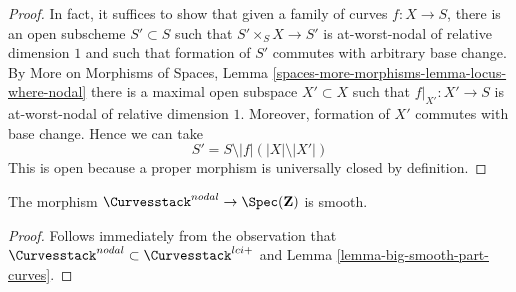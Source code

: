 \begin{proof}
In fact, it suffices to show that given a family of curves
$f : X \to S$, there is an open subscheme $S' \subset S$
such that $S' \times_S X \to S'$ is at-worst-nodal of relative dimension $1$
and such that formation of $S'$ commutes with arbitrary base change.
By More on Morphisms of Spaces, Lemma
\ref{spaces-more-morphisms-lemma-locus-where-nodal}
there is a maximal open subspace $X' \subset X$ such
that $f|_{X'} : X' \to S$ is at-worst-nodal of relative dimension $1$.
Moreover, formation of $X'$ commutes with base change.
Hence we can take
$$
S' = S \setminus |f|(|X| \setminus |X'|)
$$
This is open because a proper morphism is universally closed by
definition.
\end{proof}

\begin{lemma}
\label{lemma-nodal-curves-smooth}
The morphism $\Curvesstack^{nodal} \to \Spec(\mathbf{Z})$ is smooth.
\end{lemma}

\begin{proof}
Follows immediately from the observation that
$\Curvesstack^{nodal} \subset \Curvesstack^{lci+}$
and Lemma \ref{lemma-big-smooth-part-curves}.
\end{proof}












